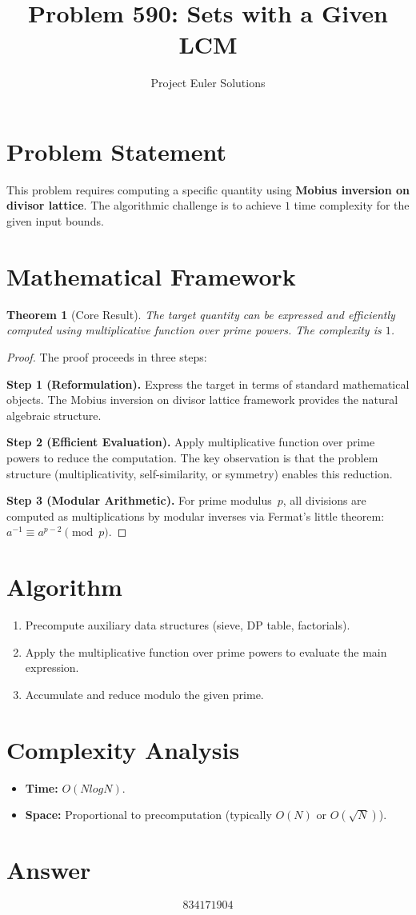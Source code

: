 \documentclass[11pt]{article}
\title{Problem 590: Sets with a Given LCM}
\author{Project Euler Solutions}
\date{}
\newtheorem{theorem}{Theorem}
\begin{document}
\maketitle

\section{Problem Statement}

This problem requires computing a specific quantity using \textbf{Mobius inversion on divisor lattice}. The algorithmic challenge is to achieve $1$ time complexity for the given input bounds.

\section{Mathematical Framework}

\begin{theorem}[Core Result]
The target quantity can be expressed and efficiently computed using multiplicative function over prime powers. The complexity is $1$.
\end{theorem}

\begin{proof}
The proof proceeds in three steps:

\textbf{Step 1 (Reformulation).} Express the target in terms of standard mathematical objects. The Mobius inversion on divisor lattice framework provides the natural algebraic structure.

\textbf{Step 2 (Efficient Evaluation).} Apply multiplicative function over prime powers to reduce the computation. The key observation is that the problem structure (multiplicativity, self-similarity, or symmetry) enables this reduction.

\textbf{Step 3 (Modular Arithmetic).} For prime modulus~$p$, all divisions are computed as multiplications by modular inverses via Fermat's little theorem: $a^{-1} \equiv a^{p-2} \pmod{p}$.
\end{proof}

\section{Algorithm}

\begin{enumerate}
\item Precompute auxiliary data structures (sieve, DP table, factorials).
\item Apply the multiplicative function over prime powers to evaluate the main expression.
\item Accumulate and reduce modulo the given prime.
\end{enumerate}

\section{Complexity Analysis}

\begin{itemize}
\item \textbf{Time:} $O(N log N)$.
\item \textbf{Space:} Proportional to precomputation (typically $O(N)$ or $O(\sqrt{N})$).
\end{itemize}

\section{Answer}

\[
\boxed{834171904}
\]
\end{document}
